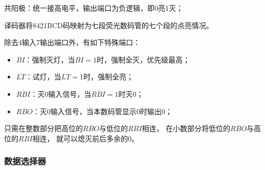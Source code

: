 \documentclass[UTF8,fontset=fandol,zihao=5]{ctexart}
\begin{document}
\begin{enumerate}
\begin{methodbox}
    共阳极：统一接高电平，输出端口为负逻辑，即0亮1灭；
  \end{methodbox}

  译码器将8421BCD码映射为七段荧光数码管的七个段的点亮情况。

  除去4输入7输出端口外，有如下特殊端口：
  
  \begin{itemize}
    \item $\overline{BI}$：强制灭灯，当$\overline{BI}=1$时，强制全灭，优先级最高；
    \item $\overline{LT}$：试灯，当$\overline{LT}=1$时，强制全亮；
    \item $\overline{RBI}$：灭0输入信号，当$\overline{RBI}=1$时灭0；
    \item $\overline{RBO}$：灭0输入信号，当本数码管显示0时输出0；
  \end{itemize}

  只需在整数部分把高位的$\overline{RBO}$与低位的$\overline{RBI}$相连，
  在小数部分将低位的$\overline{RBO}$与高位的$\overline{RBI}$相连，
  就可以熄灭前后多余的0。
\end{enumerate}

\subsubsection{数据选择器}
\end{document}
